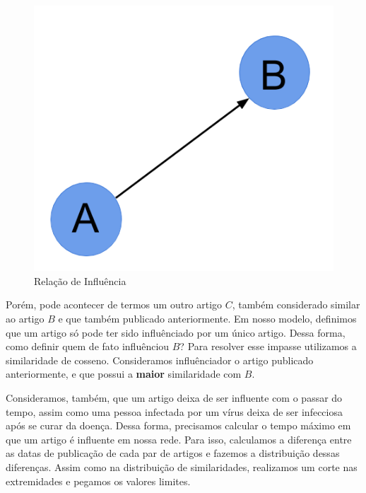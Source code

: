 \documentclass[a4paper,12pt]{article}
\begin{document}
\begin{description}
    \begin{figure}[h]
      \centering
      \includegraphics[scale=0.2]{./rede2.png}
      \caption{Relação de Influência}
    \end{figure}
    
    \pagebreak

    Porém, pode acontecer de termos um outro artigo $C$, também considerado similar ao artigo $B$ e que também publicado anteriormente. Em nosso modelo,
    definimos que um artigo só pode ter sido influênciado por um único artigo. Dessa forma, como definir quem de fato influênciou $B$? Para
    resolver esse impasse utilizamos a similaridade de cosseno. Consideramos influênciador o artigo publicado anteriormente, e que possui
    a \textbf{maior} similaridade com $B$.
    
    Consideramos, também, que um artigo deixa de ser influente com o passar do tempo, assim como uma pessoa infectada por um vírus deixa
    de ser infecciosa após se curar da doença. Dessa forma, precisamos calcular o tempo máximo em que um artigo é influente em nossa rede.
    Para isso, calculamos a diferença entre as datas de publicação de cada par de artigos e fazemos a distribuição dessas diferenças. Assim como
    na distribuição de similaridades, realizamos um corte nas extremidades e pegamos os valores limites.
 \end{description}
 
\end{document}
